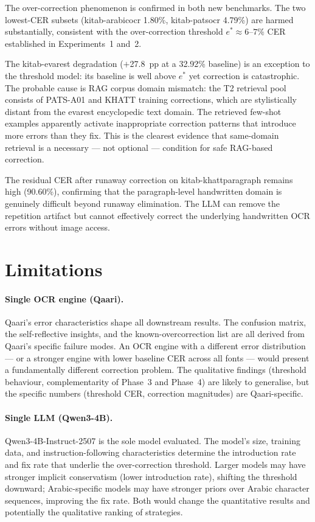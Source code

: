 The over-correction phenomenon is confirmed in both new benchmarks. The two
lowest-CER subsets (kitab-arabicocr 1.80\%, kitab-patsocr 4.79\%) are
harmed substantially, consistent with the over-correction threshold
$e^* \approx 6$--$7\%$ CER established in Experiments~1 and~2.

The kitab-evarest degradation ($+$27.8~pp at a 32.92\% baseline) is an
exception to the threshold model: its baseline is well above $e^*$ yet
correction is catastrophic. The probable cause is RAG corpus domain
mismatch: the T2 retrieval pool consists of PATS-A01 and KHATT training
corrections, which are stylistically distant from the evarest encyclopedic
text domain. The retrieved few-shot examples apparently activate
inappropriate correction patterns that introduce more errors than they fix.
This is the clearest evidence that same-domain retrieval is a necessary
--- not optional --- condition for safe RAG-based correction.

The residual CER after runaway correction on kitab-khattparagraph
remains high (90.60\%), confirming that the paragraph-level handwritten
domain is genuinely difficult beyond runaway elimination. The LLM can
remove the repetition artifact but cannot effectively correct the
underlying handwritten OCR errors without image access.

\section{Limitations}
\label{sec:disc_limitations}

\paragraph{Single OCR engine (Qaari).}
Qaari's error characteristics shape all downstream results. The confusion
matrix, the self-reflective insights, and the known-overcorrection list are
all derived from Qaari's specific failure modes. An OCR engine with a
different error distribution --- or a stronger engine with lower baseline CER
across all fonts --- would present a fundamentally different correction
problem. The qualitative findings (threshold behaviour, complementarity of
Phase~3 and Phase~4) are likely to generalise, but the specific numbers
(threshold CER, correction magnitudes) are Qaari-specific.

\paragraph{Single LLM (Qwen3-4B).}
Qwen3-4B-Instruct-2507 is the sole model evaluated. The model's size,
training data, and instruction-following characteristics determine the
introduction rate and fix rate that underlie the over-correction threshold.
Larger models may have stronger implicit conservatism (lower introduction
rate), shifting the threshold downward; Arabic-specific models may have
stronger priors over Arabic character sequences, improving the fix rate.
Both would change the quantitative results and potentially the qualitative
ranking of strategies.

